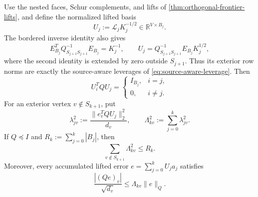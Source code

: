 \begin{theorem}
\label{thm:causal-orthogonal-response-sketches}
Use the nested faces, Schur complements, and lifts of
\cref{thm:orthogonal-frontier-lifts}, and define the normalized lifted basis
\begin{equation}
 U_j:=\mathcal L_jK_j^{-1/2}\in\mathbb R^{V\times B_j}.
 \label{eq:normalized-frontier-basis}
\end{equation}
The bordered inverse identity also gives
\begin{equation}
 E_{B_j}^TQ_{S_{j+1}S_{j+1}}^{-1}E_{B_j}=K_j^{-1},
 \qquad
 U_j
 =Q_{S_{j+1}S_{j+1}}^{-1}E_{B_j}K_j^{1/2},
 \label{eq:normalized-frontier-source-identity}
\end{equation}
where the second identity is extended by zero outside $S_{j+1}$.  Thus its
exterior row norms are exactly the source-aware leverages of
\cref{eq:source-aware-leverage}.
Then
\begin{equation}
 U_i^TQU_j=
 \begin{cases}
 I_{B_j},&i=j,\\
 0,&i\neq j.
 \end{cases}
 \label{eq:orthonormal-frontier-bases}
\end{equation}
For an exterior vertex $v\notin S_{k+1}$, put
\begin{equation}
 \lambda_{jv}^2
 :=\frac{\|e_v^TQU_j\|_2^2}{d_v},
 \qquad
 \Lambda_{kv}^2:=\sum_{j=0}^k\lambda_{jv}^2.
 \label{eq:cumulative-frontier-leverage}
\end{equation}
If $Q\preceq I$ and $R_k:=\sum_{j=0}^k|B_j|$, then
\begin{equation}
 \sum_{v\notin S_{k+1}}\Lambda_{kv}^2\leq R_k.
 \label{eq:cumulative-frontier-leverage-packing}
\end{equation}
Moreover, every accumulated lifted error
$e=\sum_{j=0}^kU_ja_j$ satisfies
\begin{equation}
 \frac{|(Qe)_v|}{\sqrt{d_v}}
 \leq\Lambda_{kv}\|e\|_Q.
 \label{eq:cumulative-frontier-interval}
\end{equation}


\end{theorem}
